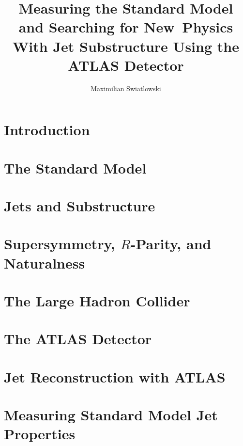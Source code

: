 \documentclass{report}
\begin{document}
\title{Measuring the Standard Model and Searching for New~Physics 
        With Jet Substructure Using the ATLAS Detector}
\author{Maximilian Swiatlowski}

 
\beforepreface
{}


\afterpreface
 
\chapter{Introduction}


\chapter{The Standard Model}



\chapter{Jets and Substructure}


\chapter{Supersymmetry, $R$-Parity, and Naturalness}



\chapter{The Large Hadron Collider}

		

\chapter{The ATLAS Detector}



\chapter{Jet Reconstruction with ATLAS}


\chapter{Measuring Standard Model Jet Properties}

\end{document}
